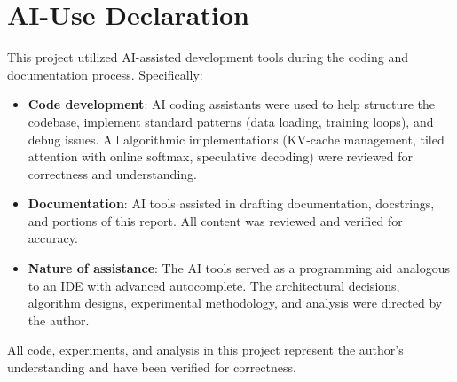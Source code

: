 \documentclass[conference]{IEEEtran}
\begin{document}
\appendix
\section{AI-Use Declaration}

This project utilized AI-assisted development tools during the coding and documentation process. Specifically:

\begin{itemize}
\item \textbf{Code development}: AI coding assistants were used to help structure the codebase, implement standard patterns (data loading, training loops), and debug issues. All algorithmic implementations (KV-cache management, tiled attention with online softmax, speculative decoding) were reviewed for correctness and understanding.

\item \textbf{Documentation}: AI tools assisted in drafting documentation, docstrings, and portions of this report. All content was reviewed and verified for accuracy.

\item \textbf{Nature of assistance}: The AI tools served as a programming aid analogous to an IDE with advanced autocomplete. The architectural decisions, algorithm designs, experimental methodology, and analysis were directed by the author.
\end{itemize}

All code, experiments, and analysis in this project represent the author's understanding and have been verified for correctness.
\end{document}
